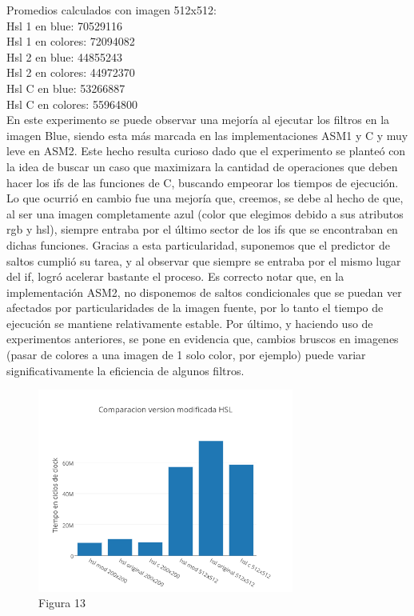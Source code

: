 \documentclass[a4paper]{article}
\begin{document}
Promedios calculados con imagen 512x512:
\\

Hsl 1 en blue: 70529116
\\

Hsl 1 en colores: 72094082
\\

Hsl 2 en blue: 44855243
\\

Hsl 2 en colores: 44972370
\\

Hsl C en blue: 53266887
\\

Hsl C en colores: 55964800
\\

En este experimento se puede observar una mejoría al ejecutar los filtros en la imagen Blue, siendo esta más marcada en las implementaciones ASM1 y C y muy leve en ASM2. Este hecho resulta curioso dado que el experimento se planteó con la idea de buscar un caso que maximizara la cantidad de operaciones que deben hacer los ifs de las funciones de C, buscando empeorar los tiempos de ejecución. Lo que ocurrió en cambio fue una mejoría que, creemos, se debe al hecho de que, al ser una imagen completamente azul (color que elegimos debido a sus atributos rgb y hsl), siempre entraba por el último sector de los ifs que se encontraban en dichas funciones. Gracias a esta particularidad, suponemos que el predictor de saltos cumplió su tarea, y al observar que siempre se entraba por el mismo lugar del if, logró acelerar bastante el proceso.
Es correcto notar que, en la implementación ASM2, no disponemos de saltos condicionales que se puedan ver afectados por particularidades de la imagen fuente, por lo tanto el tiempo de ejecución se mantiene relativamente estable.
Por último, y haciendo uso de experimentos anteriores, se pone en evidencia que, cambios bruscos en imagenes (pasar de colores a una imagen de 1 solo color, por ejemplo) puede variar significativamente la eficiencia de algunos filtros.


\begin{figure}[h]
  \centering
    \includegraphics[width=0.75\textwidth]{imagenes/ComparacionVersionModificadaHSL.png}
  \caption{Figura 13}
  \label{fig:graficohsl7}
\end{figure}
 \FloatBarrier
\end{document}
